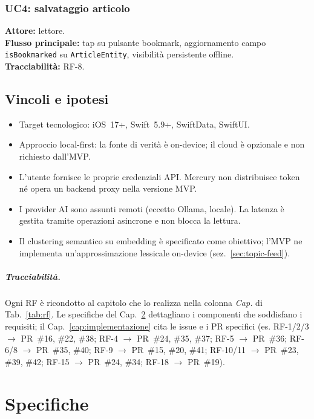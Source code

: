 \subsection*{UC4: salvataggio articolo}
\textbf{Attore:} lettore.\\
\textbf{Flusso principale:} tap su pulsante bookmark, aggiornamento campo
\texttt{isBookmarked} su \texttt{ArticleEntity}, visibilità persistente offline.\\
\textbf{Tracciabilità:} RF-8.

\section{Vincoli e ipotesi}
\begin{itemize}
  \item Target tecnologico: iOS~17+, Swift~5.9+, SwiftData, SwiftUI.
  \item Approccio local-first: la fonte di verità è on-device; il cloud è
        opzionale e non richiesto dall'MVP.
  \item L'utente fornisce le proprie credenziali API. Mercury non distribuisce
        token né opera un backend proxy nella versione MVP.
  \item I provider AI sono assunti remoti (eccetto Ollama, locale). La
        latenza è gestita tramite operazioni asincrone e non blocca la lettura.
  \item Il clustering semantico su embedding è specificato come
        obiettivo; l'MVP ne implementa un'approssimazione lessicale
        on-device (sez.~\ref{sec:topic-feed}).
\end{itemize}

\paragraph{Tracciabilità.} Ogni RF è ricondotto al capitolo che lo realizza
nella colonna \emph{Cap.} di Tab.~\ref{tab:rf}. Le specifiche del
Cap.~\ref{cap:specifiche} dettagliano i componenti che soddisfano i requisiti;
il Cap.~\ref{cap:implementazione} cita le issue e i PR specifici (es. RF-1/2/3
$\to$ PR~\#16, \#22, \#38; RF-4 $\to$ PR~\#24, \#35, \#37;
RF-5 $\to$ PR~\#36; RF-6/8 $\to$ PR~\#35, \#40; RF-9 $\to$ PR~\#15, \#20, \#41;
RF-10/11 $\to$ PR~\#23, \#39, \#42;
RF-15 $\to$ PR~\#24, \#34; RF-18 $\to$ PR~\#19).

\chapter{Specifiche}
\label{cap:specifiche}

